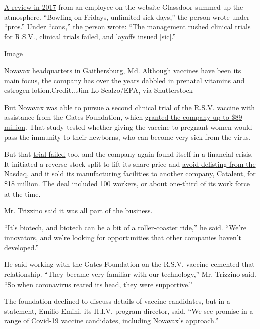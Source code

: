 \href{https://www.glassdoor.com.hk/Reviews/Novavax-let-go-Reviews-EI_IE5710.0,7_KH8,14.htm}{A
review in 2017} from an employee on the website Glassdoor summed up the
atmosphere. ``Bowling on Fridays, unlimited sick days,'' the person
wrote under ``pros.'' Under ``cons,'' the person wrote: ``The management
rushed clinical trials for R.S.V., clinical trials failed, and layoffs
insued {[}sic{]}.''

Image

Novavax headquarters in Gaithersburg, Md. Although vaccines have been
its main focus, the company has over the years dabbled in prenatal
vitamins and estrogen lotion.Credit...Jim Lo Scalzo/EPA, via
Shutterstock

But Novavax was able to pursue a second clinical trial of the R.S.V.
vaccine with assistance from the Gates Foundation, which
\href{https://ir.novavax.com/news-releases/news-release-details/novavax-announces-grant-89-million-support-development-rsv-f}{granted
the company up to \$89 million}. That study tested whether giving the
vaccine to pregnant women would pass the immunity to their newborns, who
can become very sick from the virus.

But that
\href{https://ir.novavax.com/news-releases/news-release-details/novavax-announces-topline-results-phase-3-preparetm-trial}{trial
failed} too, and the company again found itself in a financial crisis.
It initiated a reverse stock split to lift its share price and
\href{https://www.bizjournals.com/washington/news/2019/04/15/novavax-faces-delisting-threat-following-failed.html}{avoid
delisting from the Nasdaq}, and it
\href{https://endpts.com/beefing-up-its-new-gene-therapy-unit-catalent-inks-18m-deal-to-snap-up-novavax-facilities/}{sold
its manufacturing facilities} to another company, Catalent, for \$18
million. The deal included 100 workers, or about one-third of its work
force at the time.

Mr. Trizzino said it was all part of the business.

``It's biotech, and biotech can be a bit of a roller-coaster ride,'' he
said. ``We're innovators, and we're looking for opportunities that other
companies haven't developed.''

He said working with the Gates Foundation on the R.S.V. vaccine cemented
that relationship. ``They became very familiar with our technology,''
Mr. Trizzino said. ``So when coronavirus reared its head, they were
supportive.''

The foundation declined to discuss details of vaccine candidates, but in
a statement, Emilio Emini, its H.I.V. program director, said, ``We see
promise in a range of Covid-19 vaccine candidates, including Novavax's
approach.''


